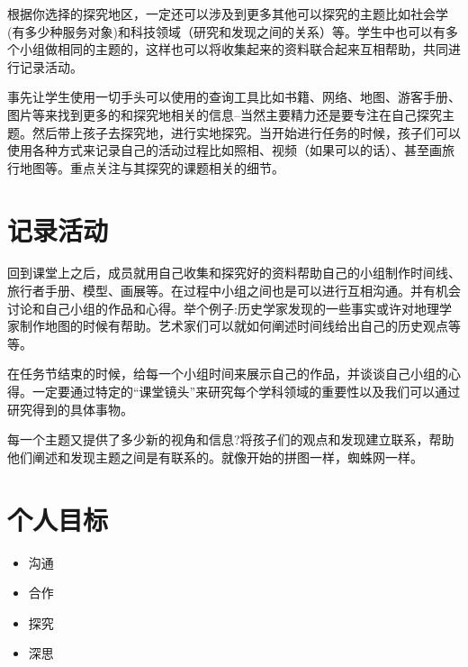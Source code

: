     \par
    根据你选择的探究地区，一定还可以涉及到更多其他可以探究的主题比如社会学(有多少种服务对象)和科技领域（研究和发现之间的关系）等。学生中也可以有多个小组做相同的主题的，这样也可以将收集起来的资料联合起来互相帮助，共同进行记录活动。\par
    事先让学生使用一切手头可以使用的查询工具比如书籍、网络、地图、游客手册、图片等来找到更多的和探究地相关的信息--当然主要精力还是要专注在自己探究主题。然后带上孩子去探究地，进行实地探究。当开始进行任务的时候，孩子们可以使用各种方式来记录自己的活动过程比如照相、视频（如果可以的话）、甚至画旅行地图等。重点关注与其探究的课题相关的细节。\par
    
\section{记录活动}
    回到课堂上之后，成员就用自己收集和探究好的资料帮助自己的小组制作时间线、旅行者手册、模型、画展等。在过程中小组之间也是可以进行互相沟通。并有机会讨论和自己小组的作品和心得。举个例子:历史学家发现的一些事实或许对地理学家制作地图的时候有帮助。艺术家们可以就如何阐述时间线给出自己的历史观点等等。\par
    在任务节结束的时候，给每一个小组时间来展示自己的作品，并谈谈自己小组的心得。一定要通过特定的“课堂镜头”来研究每个学科领域的重要性以及我们可以通过研究得到的具体事物。\par
    每一个主题又提供了多少新的视角和信息?将孩子们的观点和发现建立联系，帮助他们阐述和发现主题之间是有联系的。就像开始的拼图一样，蜘蛛网一样。\par

\section{个人目标}
    \begin{itemize}
      \item 沟通
      \item 合作
      \item 探究
      \item 深思 
    \end{itemize}
